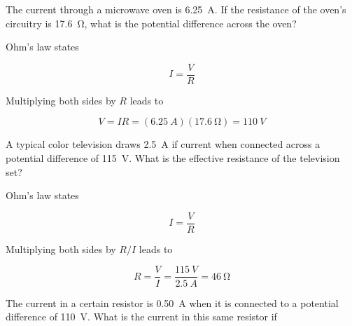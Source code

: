 \documentclass[]{exam}
\begin{document}
\begin{questions}
\question 
The current through a microwave oven is \SI{6.25}{A}. If the resistance of the oven's circuitry is \SI{17.6}{\ohm}, what is the potential difference across the oven?

\begin{solution}
Ohm's law states

\begin{equation*}
    I = \frac{V}{R}
\end{equation*}

Multiplying both sides by $R$ leads to

\begin{equation*}
    V = IR = (\SI{6.25}{A})(\SI{17.6}{\ohm}) = \boxed{\SI{110}{V}}
\end{equation*}
\end{solution}

\question
A typical color television draws \SI{2.5}{A} if current when connected across a potential difference of \SI{115}{V}. What is the effective resistance of the television set?

\begin{solution}
Ohm's law states

\begin{equation*}
    I = \frac{V}{R}
\end{equation*}

Multiplying both sides by $R/I$ leads to

\begin{equation*}
    R = \frac{V}{I} = \frac{\SI{115}{V}}{\SI{2.5}{A}} = \boxed{\SI{46}{\ohm}}
\end{equation*}
\end{solution}

\question
The current in a certain resistor is \SI{0.50}{A} when it is connected to a potential difference of \SI{110}{V}. What is the current in this same resistor if

\end{questions}
\end{document}
